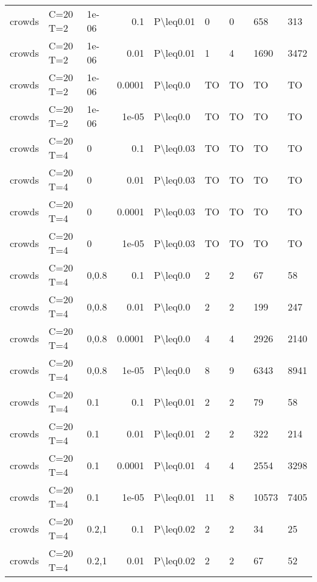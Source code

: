 \begin{longtable}{lllrlllll}
 crowds        & C=20 T=2  & 1e-06 & 0.1    & P\textbackslash{}leq0.01  & 0    & 0    & 658      & 313     \\
 crowds        & C=20 T=2  & 1e-06 & 0.01   & P\textbackslash{}leq0.01  & 1    & 4    & 1690     & 3472    \\
 crowds        & C=20 T=2  & 1e-06 & 0.0001 & P\textbackslash{}leq0.0   & TO   & TO   & TO       & TO      \\
 crowds        & C=20 T=2  & 1e-06 & 1e-05  & P\textbackslash{}leq0.0   & TO   & TO   & TO       & TO      \\
 crowds        & C=20 T=4  & 0     & 0.1    & P\textbackslash{}leq0.03  & TO   & TO   & TO       & TO      \\
 crowds        & C=20 T=4  & 0     & 0.01   & P\textbackslash{}leq0.03  & TO   & TO   & TO       & TO      \\
 crowds        & C=20 T=4  & 0     & 0.0001 & P\textbackslash{}leq0.03  & TO   & TO   & TO       & TO      \\
 crowds        & C=20 T=4  & 0     & 1e-05  & P\textbackslash{}leq0.03  & TO   & TO   & TO       & TO      \\
 crowds        & C=20 T=4  & 0,0.8 & 0.1    & P\textbackslash{}leq0.0   & 2    & 2    & 67       & 58      \\
 crowds        & C=20 T=4  & 0,0.8 & 0.01   & P\textbackslash{}leq0.0   & 2    & 2    & 199      & 247     \\
 crowds        & C=20 T=4  & 0,0.8 & 0.0001 & P\textbackslash{}leq0.0   & 4    & 4    & 2926     & 2140    \\
 crowds        & C=20 T=4  & 0,0.8 & 1e-05  & P\textbackslash{}leq0.0   & 8    & 9    & 6343     & 8941    \\
 crowds        & C=20 T=4  & 0.1   & 0.1    & P\textbackslash{}leq0.01  & 2    & 2    & 79       & 58      \\
 crowds        & C=20 T=4  & 0.1   & 0.01   & P\textbackslash{}leq0.01  & 2    & 2    & 322      & 214     \\
 crowds        & C=20 T=4  & 0.1   & 0.0001 & P\textbackslash{}leq0.01  & 4    & 4    & 2554     & 3298    \\
 crowds        & C=20 T=4  & 0.1   & 1e-05  & P\textbackslash{}leq0.01  & 11   & 8    & 10573    & 7405    \\
 crowds        & C=20 T=4  & 0.2,1 & 0.1    & P\textbackslash{}leq0.02  & 2    & 2    & 34       & 25      \\
 crowds        & C=20 T=4  & 0.2,1 & 0.01   & P\textbackslash{}leq0.02  & 2    & 2    & 67       & 52      \\

\end{longtable}
